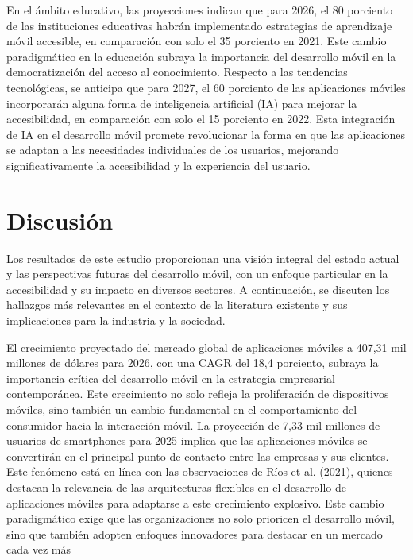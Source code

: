 \documentclass[12pt]{article}
\begin{document}
En el ámbito educativo, las proyecciones indican que para 2026, el 80 porciento de las instituciones educativas habrán implementado estrategias de aprendizaje móvil accesible, en comparación con solo el 35 porciento en 2021. Este cambio paradigmático en la educación subraya la importancia del desarrollo móvil en la democratización del acceso al conocimiento.
Respecto a las tendencias tecnológicas, se anticipa que para 2027, el 60 porciento de las aplicaciones móviles incorporarán alguna forma de inteligencia artificial (IA) para mejorar la accesibilidad, en comparación con solo el 15 porciento en 2022. Esta integración de IA en el desarrollo móvil promete revolucionar la forma en que las aplicaciones se adaptan a las necesidades individuales de los usuarios, mejorando significativamente la accesibilidad y la experiencia del
usuario.

\section*{Discusión}
Los resultados de este estudio proporcionan una visión integral del estado actual y las perspectivas futuras del desarrollo móvil, con un enfoque particular en la accesibilidad y su impacto en diversos sectores. A continuación, se discuten los hallazgos más relevantes en el contexto de la literatura existente y sus implicaciones para la industria y la sociedad.

El crecimiento proyectado del mercado global de aplicaciones móviles a 407,31 mil millones de dólares para 2026, con una CAGR del 18,4 porciento, subraya la importancia crítica del desarrollo móvil en la estrategia empresarial contemporánea. Este crecimiento no solo refleja la proliferación de dispositivos móviles, sino también un cambio fundamental en el comportamiento del consumidor hacia la interacción móvil.
La proyección de 7,33 mil millones de usuarios de smartphones para 2025 implica que las aplicaciones móviles se convertirán en el principal punto de contacto entre las empresas y sus clientes. Este fenómeno está en línea con las observaciones de Ríos et al. (2021), quienes destacan la relevancia de las arquitecturas flexibles en el desarrollo de aplicaciones móviles para adaptarse a este crecimiento explosivo.
Este cambio paradigmático exige que las organizaciones no solo prioricen el desarrollo móvil, sino que también adopten enfoques innovadores para destacar en un mercado cada vez más
 
\end{document}
